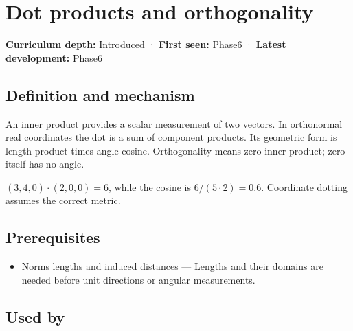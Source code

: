 \hypertarget{appendix-8bc4e8fc547c}{}\label{referencestart:appendix-8bc4e8fc547c}
\section{Dot products and orthogonality}\label{appendix-8bc4e8fc547c-dot-products-and-orthogonality}

\textbf{Curriculum depth:} Introduced · \textbf{First seen:} Phase6 · \textbf{Latest development:} Phase6

\subsection{Definition and mechanism}\label{appendix-8bc4e8fc547c-definition-and-mechanism}

An inner product provides a scalar measurement of two vectors. In orthonormal real coordinates the dot is a sum of component products. Its geometric form is length product times angle cosine. Orthogonality means zero inner product; zero itself has no angle.

\((3,4,0)\cdot(2,0,0)=6\), while the cosine is \(6/(5\cdot2)=0.6\). Coordinate dotting assumes the correct metric.

\subsection{Prerequisites}\label{appendix-8bc4e8fc547c-prerequisites}

\begin{itemize}
\tightlist
\item
  \hyperref[appendix-49933872bb51]{Norms lengths and induced distances} --- Lengths and their domains are needed before unit directions or angular measurements.
\end{itemize}

\subsection{Used by}\label{appendix-8bc4e8fc547c-used-by}

